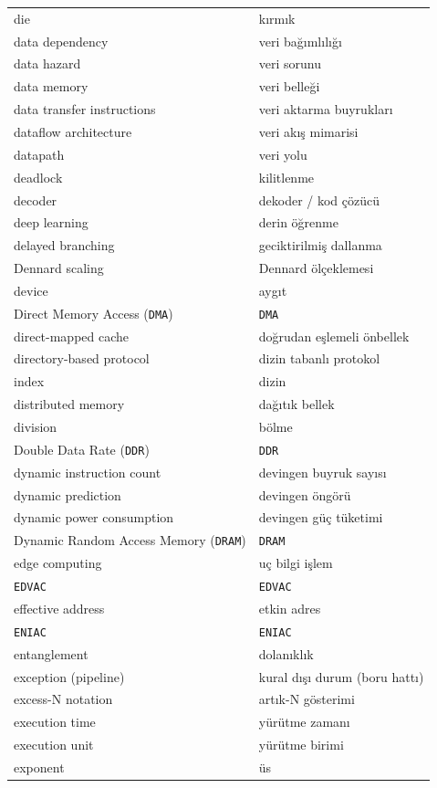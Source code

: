 {\begin{longtable}{@{}p{7.6cm}p{7.6cm}@{}}
die & kırmık \\
data dependency & veri bağımlılığı \\
data hazard & veri sorunu \\
data memory & veri belleği \\
data transfer instructions & veri aktarma buyrukları \\
dataflow architecture & veri akış mimarisi \\
datapath & veri yolu \\
deadlock & kilitlenme \\
decoder & dekoder / kod çözücü \\
deep learning & derin öğrenme \\
delayed branching & geciktirilmiş dallanma \\
Dennard scaling & Dennard ölçeklemesi \\
device & aygıt \\
Direct Memory Access (\texttt{DMA}) & \texttt{DMA} \\
direct-mapped cache & doğrudan eşlemeli önbellek \\
directory-based protocol & dizin tabanlı protokol \\
index & dizin \\
distributed memory & dağıtık bellek \\
division & bölme \\
Double Data Rate (\texttt{DDR}) & \texttt{DDR} \\
dynamic instruction count & devingen buyruk sayısı \\
dynamic prediction & devingen öngörü \\
dynamic power consumption & devingen güç tüketimi \\
Dynamic Random Access Memory (\texttt{DRAM}) & \texttt{DRAM} \\

edge computing & uç bilgi işlem \\
\texttt{EDVAC} & \texttt{EDVAC} \\
effective address & etkin adres \\
\texttt{ENIAC} & \texttt{ENIAC} \\
entanglement & dolanıklık \\
exception (pipeline) & kural dışı durum (boru hattı) \\
excess-N notation & artık-N gösterimi \\
execution time & yürütme zamanı \\
execution unit & yürütme birimi \\
exponent & üs \\


\end{longtable}}
